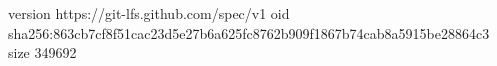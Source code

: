 version https://git-lfs.github.com/spec/v1
oid sha256:863cb7cf8f51cac23d5e27b6a625fc8762b909f1867b74cab8a5915be28864c3
size 349692
